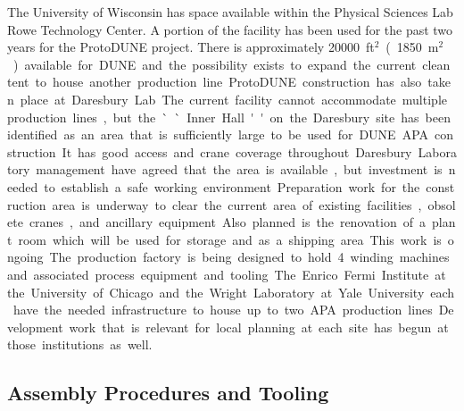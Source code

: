 The University of Wisconsin has space available within the Physical Sciences Lab Rowe Technology Center. A portion of the facility has been used for the past two years for the ProtoDUNE project. There is approximately \SI{20000}{ft$^2$} (\SI{1850}{m$^2$}) available for DUNE and the possibility exists to expand the current clean tent to house another production line. 

ProtoDUNE construction has also taken place at Daresbury Lab.  The current facility cannot accommodate multiple production lines, but the ``Inner Hall'' on the Daresbury site has been identified as an area that is sufficiently large to be used for DUNE APA construction. It has good access and crane coverage throughout. Daresbury Laboratory management have agreed that the area is available, but investment is needed to establish a safe working environment. Preparation work for the construction area is underway to clear the current area of existing facilities, obsolete cranes, and ancillary equipment. Also planned is the renovation of a plant room which will be used for storage and as a shipping area. This work is ongoing. The production factory is being designed to hold 4 winding machines and associated process equipment and tooling. 

The Enrico Fermi Institute at the University of Chicago and the Wright Laboratory at Yale University each have the needed infrastructure to house up to two APA production lines. Development work that is relevant for local planning at each site has begun at those institutions as well.


\subsection{Assembly Procedures and Tooling}
\label{sec:fdsp-apa-assy}

